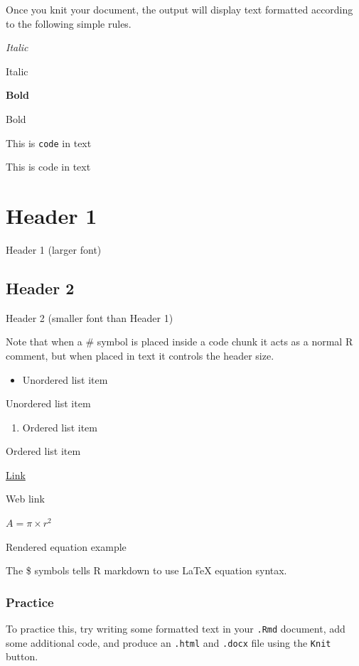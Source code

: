 \documentclass[
]{article}
\providecommand{\tightlist}{%
  \setlength{\itemsep}{0pt}\setlength{\parskip}{0pt}}
\begin{document}
Once you knit your document, the output will display text formatted
according to the following simple rules.

\emph{Italic}

Italic

\textbf{Bold}

Bold

This is \texttt{code} in text

This is code in text

\section{Header 1}\label{header-1}

Header 1 (larger font)

\subsection{Header 2}\label{header-2}

Header 2 (smaller font than Header 1)

Note that when a \# symbol is placed inside a code chunk it acts as a
normal R comment, but when placed in text it controls the header size.

\begin{itemize}
\tightlist
\item
  Unordered list item
\end{itemize}

Unordered list item

\begin{enumerate}
\def\labelenumi{\arabic{enumi}.}
\tightlist
\item
  Ordered list item
\end{enumerate}

Ordered list item

\href{https://www.google.com}{Link}

Web link

\(A = \pi \times r^{2}\)

Rendered equation example

The \$ symbols tells R markdown to use LaTeX equation syntax.

\subsubsection{\texorpdfstring{\textbf{Practice}}{Practice}}\label{practice}

To practice this, try writing some formatted text in your \texttt{.Rmd}
document, add some additional code, and produce an \texttt{.html} and
\texttt{.docx} file using the \texttt{Knit} button.
\end{document}

